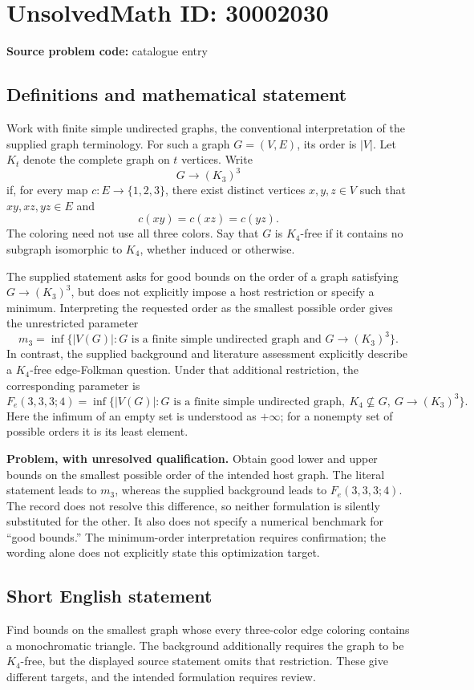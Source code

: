 \documentclass[11pt]{article}
\begin{document}
\section*{UnsolvedMath ID: 30002030}
\textbf{Source problem code:} catalogue entry
\subsection{Definitions and mathematical statement}
Work with finite simple undirected graphs, the conventional interpretation of the supplied graph terminology. For such a graph \(G=(V,E)\), its order is \(|V|\). Let \(K_t\) denote the complete graph on \(t\) vertices. Write
\[
G\longrightarrow(K_3)^3
\]
if, for every map \(c:E\to\{1,2,3\}\), there exist distinct vertices \(x,y,z\in V\) such that \(xy,xz,yz\in E\) and
\[
c(xy)=c(xz)=c(yz).
\]
The coloring need not use all three colors. Say that \(G\) is \(K_4\)-free if it contains no subgraph isomorphic to \(K_4\), whether induced or otherwise.

The supplied statement asks for good bounds on the order of a graph satisfying \(G\longrightarrow(K_3)^3\), but does not explicitly impose a host restriction or specify a minimum. Interpreting the requested order as the smallest possible order gives the unrestricted parameter
\[
m_3=\inf\bigl\{|V(G)|:G\text{ is a finite simple undirected graph and }G\longrightarrow(K_3)^3\bigr\}.
\]
In contrast, the supplied background and literature assessment explicitly describe a \(K_4\)-free edge-Folkman question. Under that additional restriction, the corresponding parameter is
\[
F_e(3,3,3;4)=\inf\bigl\{|V(G)|:G\text{ is a finite simple undirected graph},\ K_4\nsubseteq G,\ G\longrightarrow(K_3)^3\bigr\}.
\]
Here the infimum of an empty set is understood as \(+\infty\); for a nonempty set of possible orders it is its least element.

\textbf{Problem, with unresolved qualification.} Obtain good lower and upper bounds on the smallest possible order of the intended host graph. The literal statement leads to \(m_3\), whereas the supplied background leads to \(F_e(3,3,3;4)\). The record does not resolve this difference, so neither formulation is silently substituted for the other. It also does not specify a numerical benchmark for ``good bounds.'' The minimum-order interpretation requires confirmation; the wording alone does not explicitly state this optimization target.
\subsection{Short English statement}
Find bounds on the smallest graph whose every three-color edge coloring contains a monochromatic triangle. The background additionally requires the graph to be \(K_4\)-free, but the displayed source statement omits that restriction. These give different targets, and the intended formulation requires review.
\end{document}
